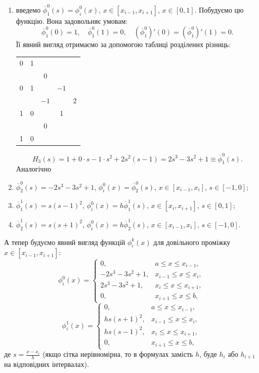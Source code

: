 \begin{enumerate}
    \item введемо $\overline{\phi}_1^0(s) = \phi_i^0(x)$, $x\in[x_{i-1},x_{i+1}]$, $x\in[0,1]$. Побудуємо цю функцію. Вона задовольняє умовам:
    \[ \overline{\phi}_1^0(0) = 1, \quad \overline{\phi}_1^0(1) = 0,\quad (\overline{\phi}_1^0)'(0)=(\overline{\phi}_1^0)'(1)=0.\]
    Її явний вигляд отримаємо за допомогою таблиці розділених різниць:
    \begin{table}[H]
        \centering
        \begin{tabular}{c|cccc}
            0 & 1 & & & \\
            & & 0 & & \\
            0 & 1 & & $-1$ & \\
            & & $-1$ & & 2 \\
            1 & 0 & & 1 & \\
            & & 0 & & \\
            1 & 0 & & & \\
        \end{tabular}
    \end{table}
    \[ H_3(s) = 1 + 0 \cdot s - 1 \cdot s^2 + 2 s^2(s-1) = 2s^3 - 3s^2 + 1 \equiv \overline{\phi}_1^0(s).\]
    Аналогічно
    \item $\overline{\phi}_2^0(s) = -2s^3 - 3s^2 + 1$, $\phi_i^0(x) = \overline{\phi}_2^0(s)$, $x\in [x_{i-1},x_i]$, $s\in[-1,0]$;
    \item $\overline{\phi}_1^1(s) = s(s-1)^2$, $\phi_i^0(x) = h\overline{\phi}_1^1(s)$, $x\in [x_i,x_{i+1}]$, $s\in[0,1]$;
    \item $\overline{\phi}_2^1(s) = s(s+1)^2$, $\phi_i^0(x) = h\overline{\phi}_2^1(s)$, $x\in [x_{i-1},x_i]$, $s\in[-1,0]$.
\end{enumerate} 
А тепер будуємо явний вигляд функцій $\phi_i^k(x)$ для довільного проміжку $x\in[x_{i-1},x_{i+1}]$:
\[ \phi_i^0(x) = \begin{cases} 0, & a \le x \le x_{i-1}, \\
 -2s^3-3s^2+1, & x_{i-1}\le x\le x_i, \\
 2s^3-3s^2+1, & x_i\le x\le x_{i+1}, \\
 0, & x_{i+1} \le x \le b, \end{cases} \]
\[ \phi_i^1(x) = \begin{cases} 0, & a \le x \le x_{i-1}, \\
 hs(s+1)^2, & x_{i-1}\le x\le x_i, \\
 hs(s-1)^2, & x_i\le x\le x_{i+1}, \\
 0, & x_{i+1} \le x \le b, \end{cases} \]
де $s = \frac{x-x_i}{h}$ (якщо сітка нерівномірна, то в формулах замість $h$, буде $h_i$ або $h_{i+1}$ на відповідних інтервалах). \\
